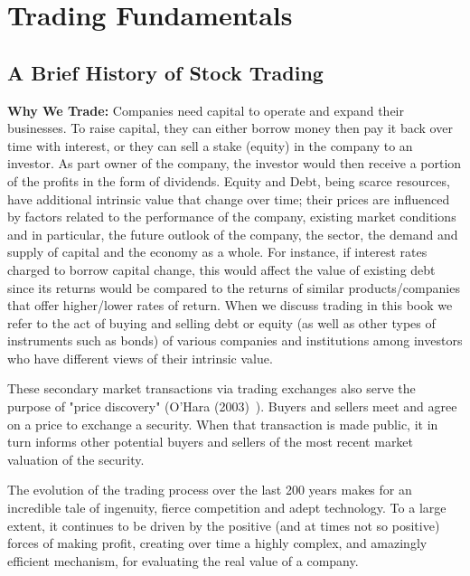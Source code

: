 \chapter{Trading Fundamentals\label{chap:ch_trading_fund}}
\section{A Brief History of Stock Trading}

\noindent\textbf{Why We Trade:} Companies need capital to operate and expand their businesses. To raise capital, they can either borrow money then pay it back over time with interest, or they can sell a stake (equity) in the company to an investor. As part owner of the company, the investor would then receive a portion of the profits in the form of dividends. Equity and Debt, being scarce resources, have additional intrinsic value that change over time; their prices are influenced by factors related to the performance of the company, existing market conditions and in particular, the future outlook of the company, the sector, the demand and supply of capital and the economy as a whole. For instance, if interest rates charged to borrow capital change, this would affect the value of existing debt since its returns would be compared to the returns of similar products/companies that offer higher/lower rates of return. When we discuss trading in this book we refer to the act of buying and selling debt or equity (as well as other types of instruments such as bonds) of various companies and institutions among investors who have different views of their intrinsic value.


These secondary market transactions via trading exchanges also serve the purpose of "price discovery" (O'Hara (2003)~\cite{ohara}). Buyers and sellers meet and agree on a price to exchange a security. When that transaction is made public, it in turn informs other potential buyers and sellers of the most recent market valuation of the security.


The evolution of the trading process  over the last 200 years makes for an incredible tale of ingenuity, fierce competition and adept technology. To a large extent, it continues to be driven by the positive (and at times not so positive) forces of making profit, creating over time a highly complex, and amazingly efficient mechanism, for evaluating the real value of a company. \twomedskip


